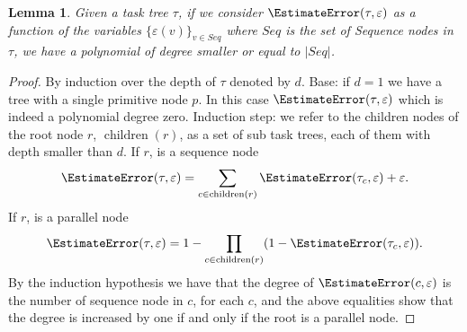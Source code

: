 \documentclass[review]{elsarticle}
\newtheorem{lemma}{Lemma}
\DeclareMathOperator{\ch}{\operatorname{children}}
\begin{document}
\begin{lemma}\label{lemma:poly}
Given a task tree $\tau$, if we consider $\EstimateError(\tau,\varepsilon)$ as a function of the variables $\{\varepsilon(v)\}_{v\in Seq}$ where $Seq$ is the set of Sequence nodes in $\tau$, we have a polynomial of degree smaller or equal to $|Seq|$.  
\end{lemma}
\begin{proof}
By induction over the depth of $\tau$ denoted by $d$. Base: if $d=1$ we have a tree with a single primitive node $p$. In this case  $\EstimateError(\tau,\varepsilon)$ which is indeed a polynomial degree zero.
Induction step: we refer to the children nodes of the root node $r$, $\ch(r)$, as a set of sub task trees, each of them with depth smaller than $d$. If $r$, is a sequence node 
$$\EstimateError(\tau,\varepsilon)=\sum_{c\in \ch(r)}\EstimateError(\tau_c,\varepsilon) +  \varepsilon.$$ 
If $r$, is a parallel node  $$\EstimateError(\tau,\varepsilon)=1-\prod_{c\in \ch(r)} (1-\EstimateError(\tau_c,\varepsilon)).$$ 
By the induction hypothesis we have that the degree of $\EstimateError(c,\varepsilon)$ is the number of sequence node in $c$, for each $c$, and the above equalities show that the degree is increased by one if and only if the root is a parallel node. 
\end{proof}



%
%
\end{document}
